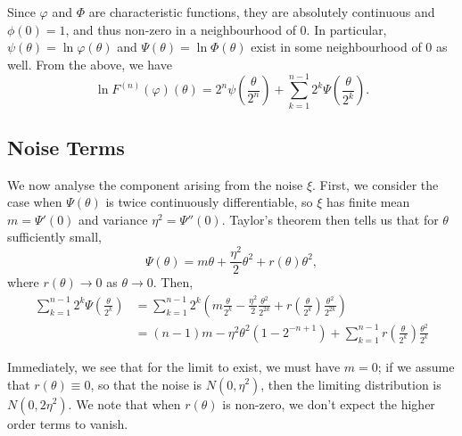 \documentclass{article}
\theoremstyle{remark}
\theoremstyle{definition}
\begin{document}
Since $\varphi$ and $\Phi$ are characteristic functions, they are absolutely continuous and $\phi(0) = 1$, and thus non-zero in a neighbourhood of 0. In particular, $\psi(\theta) = \ln{\varphi}(\theta)$ and $\Psi(\theta) = \ln{\Phi(\theta)}$ exist in some neighbourhood of 0 as well.  From the above, we have
\[
	\ln{F^{(n)}(\varphi)(\theta)} = {\textstyle 2^{n} \psi\left(\frac{\theta}{2^{n}}\right)} 
		+ \sum_{k=1}^{n-1}  {\textstyle 2^{k} \Psi\left(\frac{\theta}{2^{k}}\right)}.
\]

\subsection{Noise Terms}

We now analyse the component arising from the noise $\xi$.  First, we consider the case when $\Psi(\theta)$ is twice continuously differentiable, so $\xi$ has finite mean $m = \Psi'(0)$
and variance $\eta^{2} = \Psi''(0)$.   Taylor's theorem then tells us that for $\theta$ sufficiently small, 
\[
	\Psi(\theta) = m\theta + \frac{\eta^{2}}{2} \theta^{2} + r(\theta)\theta^{2},
\]
where $r(\theta) \to 0$ as $\theta \to 0$.  Then,
\begin{align*}
	 \sum_{k=1}^{n-1}  {\textstyle 2^{k} \Psi\left(\frac{\theta}{2^{k}}\right)}
	 &=  \sum_{k=1}^{n-1} 2^{k} {\textstyle \left(m \frac{\theta}{2^{k}} - \frac{\eta^{2}}{2}  \frac{\theta^{2}}{2^{2k}}
		+ r\left(\frac{\theta}{2^{k}}\right)\frac{\theta^{2}}{2^{2k}}\right)}\\
	&= (n-1) m - \eta^{2} \theta^{2} (1 - 2^{-n+1}) 
		+ \sum_{k=1}^{n-1} {\textstyle r\left(\frac{\theta}{2^{k}}\right)\frac{\theta^{2}}{2^{k}}}
 \end{align*}

Immediately, we see that for the limit to exist, we must have $m = 0$; if we assume that $r(\theta) \equiv 0$, so that the noise is $N(0,\eta^{2})$, then the limiting distribution is $N(0,2\eta^{2})$. We note that when  $r(\theta)$ is non-zero, we don't expect the higher order terms to vanish.
\end{document}

